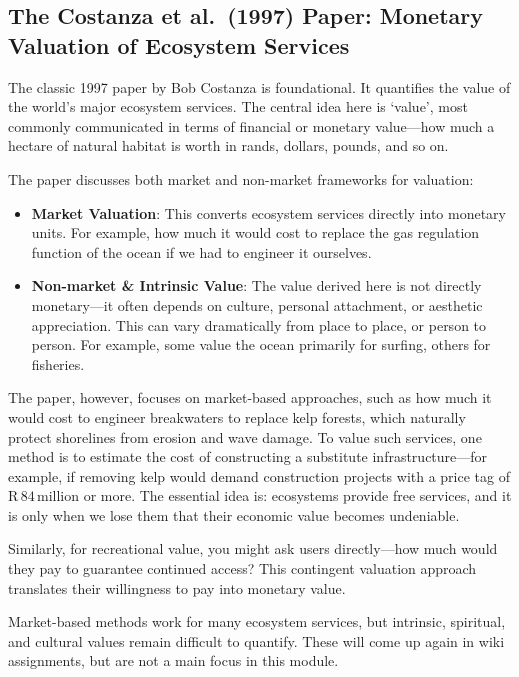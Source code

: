 \documentclass[
  10pt,
]{book}
\providecommand{\tightlist}{%
  \setlength{\itemsep}{0pt}\setlength{\parskip}{0pt}}
\begin{document}
\subsection{The Costanza et al.~(1997) Paper: Monetary Valuation of
Ecosystem
Services}\label{the-costanza-et-al.-1997-paper-monetary-valuation-of-ecosystem-services}

The classic 1997 paper by Bob Costanza is foundational. It quantifies
the value of the world's major ecosystem services. The central idea here
is `value', most commonly communicated in terms of financial or monetary
value---how much a hectare of natural habitat is worth in rands,
dollars, pounds, and so on.

The paper discusses both market and non-market frameworks for valuation:

\begin{itemize}
\tightlist
\item
  \textbf{Market Valuation}: This converts ecosystem services directly
  into monetary units. For example, how much it would cost to replace
  the gas regulation function of the ocean if we had to engineer it
  ourselves.
\item
  \textbf{Non-market \& Intrinsic Value}: The value derived here is not
  directly monetary---it often depends on culture, personal attachment,
  or aesthetic appreciation. This can vary dramatically from place to
  place, or person to person. For example, some value the ocean
  primarily for surfing, others for fisheries.
\end{itemize}

The paper, however, focuses on market-based approaches, such as how much
it would cost to engineer breakwaters to replace kelp forests, which
naturally protect shorelines from erosion and wave damage. To value such
services, one method is to estimate the cost of constructing a
substitute infrastructure---for example, if removing kelp would demand
construction projects with a price tag of
\(\text{R}\,84\,\text{million}\) or more. The essential idea is:
ecosystems provide free services, and it is only when we lose them that
their economic value becomes undeniable.

Similarly, for recreational value, you might ask users directly---how
much would they pay to guarantee continued access? This contingent
valuation approach translates their willingness to pay into monetary
value.

Market-based methods work for many ecosystem services, but intrinsic,
spiritual, and cultural values remain difficult to quantify. These will
come up again in wiki assignments, but are not a main focus in this
module.
\end{document}
